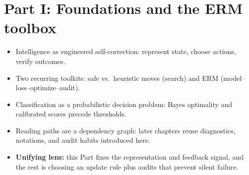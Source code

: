 %

\part*{Part I: Foundations and the ERM toolbox}




\begin{tcolorbox}[summarybox, title={Part I takeaways}]
\begin{itemize}
  \item Intelligence as engineered self-correction: represent state, choose actions, verify outcomes.
  \item Two recurring toolkits: safe vs.\ heuristic moves (search) and ERM (model--loss--optimize--audit).
  \item Classification as a probabilistic decision problem: Bayes optimality and calibrated scores precede thresholds.
  \item Reading paths are a dependency graph: later chapters reuse diagnostics, notations, and audit habits introduced here.
  \item \textbf{Unifying lens:} this Part fixes the representation and feedback signal, and the rest is choosing an update rule plus audits that prevent silent failure.
\end{itemize}
\end{tcolorbox}
